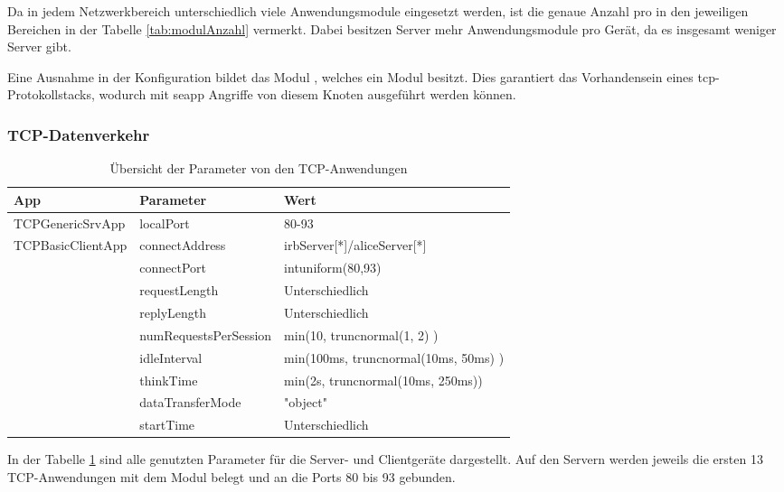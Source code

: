 Da in jedem Netzwerkbereich unterschiedlich viele Anwendungsmodule eingesetzt werden, ist die genaue Anzahl pro  in den jeweiligen Bereichen in der Tabelle \ref{tab:modulAnzahl} vermerkt. Dabei besitzen Server mehr Anwendungsmodule pro Gerät, da es insgesamt weniger Server gibt. 

Eine Ausnahme in der Konfiguration bildet das Modul , welches ein Modul  besitzt. Dies garantiert das Vorhandensein eines \gls{tcp}-Protokollstacks, wodurch mit \gls{seapp} Angriffe von diesem Knoten ausgeführt werden können. 

\subsubsection{TCP-Datenverkehr}
\begin{table}[ht]
	\centering
	\begin{tabularx}{\textwidth}{|l|X|X|}
		\hline
		\rowcolor{Gainsboro!60}
		App      & Parameter             & Wert                                      \\ \hline
		TCPGenericSrvApp                   & localPort             & 80-93                                     \\ \hline
		\multirow{9}{*}{TCPBasicClientApp} & connectAddress        & irbServer[*]/aliceServer[*] \\ \cline{2-3}
		                                   & connectPort           & intuniform(80,93)                         \\ \cline{2-3}
		                                   & requestLength         & Unterschiedlich \\ \cline{2-3}
		                                   & replyLength           & Unterschiedlich \\ \cline{2-3}
		                                   & numRequestsPerSession & min(10, truncnormal(1, 2) )               \\ \cline{2-3}
		                                   & idleInterval          & min(100ms, truncnormal(10ms, 50ms) )      \\ \cline{2-3}
		                                   & thinkTime             & min(2s, truncnormal(10ms, 250ms))         \\ \cline{2-3}
		                                   & dataTransferMode      & "{}object"                                \\ \cline{2-3}
		                                   & startTime             & Unterschiedlich \\ \hline
	\end{tabularx}
	\caption{Übersicht der Parameter von den TCP-Anwendungen}
	\label{tab:tcpModule}
\end{table}
In der Tabelle \ref{tab:tcpModule} sind alle genutzten Parameter für die Server- und Clientgeräte dargestellt. Auf den Servern werden jeweils die ersten 13 TCP-Anwendungen mit dem Modul  belegt und an die Ports 80 bis 93 gebunden. 

